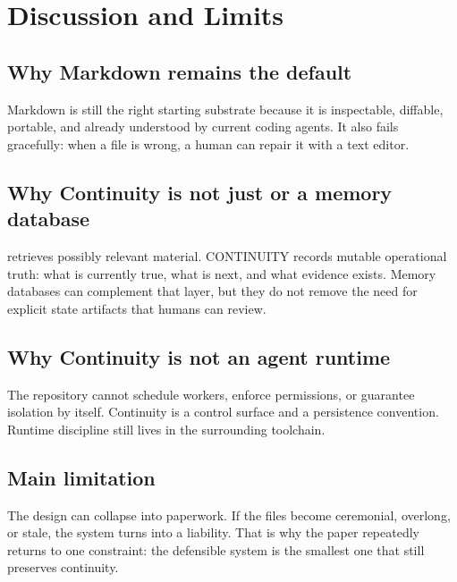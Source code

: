 
\section{Discussion and Limits}



\subsection{Why Markdown remains the default}

Markdown is still the right starting substrate because it is inspectable, diffable, portable, and already understood by current coding agents. It also fails gracefully: when a file is wrong, a human can repair it with a text editor.

\subsection{Why Continuity is not just \RAG{} or a memory database}

\RAG{} retrieves possibly relevant material. CONTINUITY records mutable operational truth: what is currently true, what is next, and what evidence exists. Memory databases can complement that layer, but they do not remove the need for explicit state artifacts that humans can review.

\subsection{Why Continuity is not an agent runtime}

The repository cannot schedule workers, enforce permissions, or guarantee isolation by itself. Continuity is a control surface and a persistence convention. Runtime discipline still lives in the surrounding toolchain.

\subsection{Main limitation}

The design can collapse into paperwork. If the files become ceremonial, overlong, or stale, the system turns into a liability. That is why the paper repeatedly returns to one constraint: the defensible system is the smallest one that still preserves continuity.
